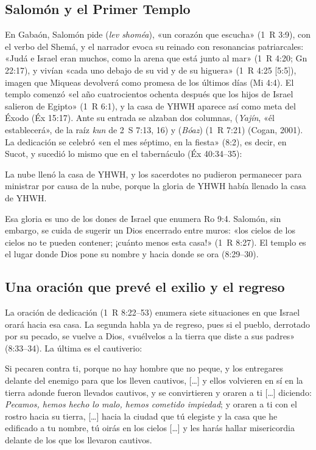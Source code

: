 \subsection{Salomón y el Primer Templo}
En Gabaón, Salomón pide  (\emph{lev shoméa}), «un corazón que escucha» (1~R 3:9), con el verbo del Shemá, y el narrador evoca su reinado con resonancias patriarcales: «Judá e Israel eran muchos, como la arena que está junto al mar» (1~R 4:20; Gn 22:17), y vivían «cada uno debajo de su vid y de su higuera» (1~R 4:25 [5:5]), imagen que Miqueas devolverá como promesa de los últimos días (Mi 4:4). El templo comenzó «el año cuatrocientos ochenta después que los hijos de Israel salieron de Egipto» (1~R 6:1), y la casa de YHWH aparece así como meta del Éxodo (Éx 15:17). Ante su entrada se alzaban dos columnas,  (\emph{Yajín}, «él establecerá», de la raíz \emph{kun} de 2~S 7:13, 16) y  (\emph{Bóaz}) (1~R 7:21) (Cogan, 2001). La dedicación se celebró «en el mes séptimo, en la fiesta» (8:2), es decir, en Sucot, y sucedió lo mismo que en el tabernáculo (Éx 40:34--35):

\begin{cita}La nube llenó la casa de YHWH, y los sacerdotes no pudieron permanecer para ministrar por causa de la nube, porque la gloria de YHWH había llenado la casa de YHWH.\end{cita}

Esa gloria es uno de los dones de Israel que enumera Ro 9:4. Salomón, sin embargo, se cuida de sugerir un Dios encerrado entre muros: «los cielos de los cielos no te pueden contener; ¡cuánto menos esta casa!» (1~R 8:27). El templo es el lugar donde Dios pone su nombre y hacia donde se ora (8:29--30).

\subsection{Una oración que prevé el exilio y el regreso}
La oración de dedicación (1~R 8:22--53) enumera siete situaciones en que Israel orará hacia esa casa. La segunda habla ya de regreso, pues si el pueblo, derrotado por su pecado, se vuelve a Dios, «vuélvelos a la tierra que diste a sus padres» (8:33--34). La última es el cautiverio:

\begin{cita}Si pecaren contra ti, porque no hay hombre que no peque, y los entregares delante del enemigo para que los lleven cautivos, [\ldots] y ellos volvieren en sí en la tierra adonde fueron llevados cautivos, y se convirtieren y oraren a ti [\ldots] diciendo: \emph{Pecamos, hemos hecho lo malo, hemos cometido impiedad}; y oraren a ti con el rostro hacia su tierra, [\ldots] hacia la ciudad que tú elegiste y la casa que he edificado a tu nombre, tú oirás en los cielos [\ldots] y les harás hallar misericordia delante de los que los llevaron cautivos.\end{cita}

